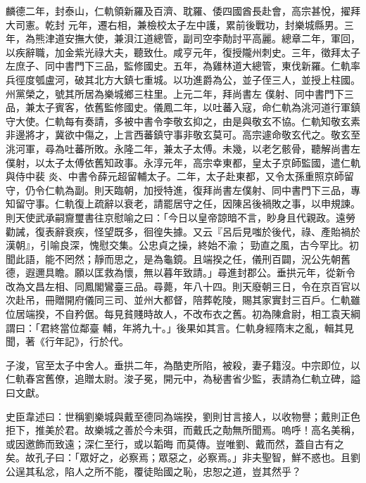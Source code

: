 \begin{pinyinscope}
 麟德二年，封泰山，仁軌領新羅及百濟、耽羅、倭四國酋長赴會，高宗甚悅，擢拜大司憲。乾封
 元年，遷右相，兼檢校太子左中護，累前後戰功，封樂城縣男。三年，為熊津道安撫大使，兼浿江道總管，副司空李勣討平高麗。總章二年，軍回，以疾辭職，加金紫光祿大夫，聽致仕。咸亨元年，復授隴州刺史。三年，徵拜太子左庶子、同中書門下三品，監修國史。五年，為雞林道大總管，東伐新羅。仁軌率兵徑度瓠盧河，破其北方大鎮七重城。以功進爵為公，並子侄三人，並授上柱國。州黨榮之，號其所居為樂城鄉三柱里。上元二年，拜尚書左
 僕射、同中書門下三品，兼太子賓客，依舊監修國史。儀鳳二年，以吐蕃入寇，命仁軌為洮河道行軍鎮守大使。仁軌每有奏請，多被中書令李敬玄抑之，由是與敬玄不協。仁軌知敬玄素非邊將才，冀欲中傷之，上言西蕃鎮守事非敬玄莫可。高宗遽命敬玄代之。敬玄至洮河軍，尋為吐蕃所敗。永隆二年，兼太子太傅。未幾，以老乞骸骨，聽解尚書左僕射，以太子太傅依舊知政事。永淳元年，高宗幸東都，皇太子京師監國，遣仁軌與侍中裴
 炎、中書令薛元超留輔太子。二年，太子赴東都，又令太孫重照京師留守，仍令仁軌為副。則天臨朝，加授特進，復拜尚書左僕射、同中書門下三品，專知留守事。仁軌復上疏辭以衰老，請罷居守之任，因陳呂後禍敗之事，以申規諫。則天使武承嗣齎璽書往京慰喻之曰：「今日以皇帝諒暗不言，眇身且代親政。遠勞勸誡，復表辭衰疾，怪望既多，徊徨失據。又云『呂后見嗤於後代，祿、產貽禍於漢朝』，引喻良深，愧慰交集。公忠貞之操，終始不渝；
 勁直之風，古今罕比。初聞此語，能不罔然；靜而思之，是為龜鏡。且端揆之任，儀刑百闢，況公先朝舊德，遐邇具瞻。願以匡救為懷，無以暮年致請。」尋進封郡公。垂拱元年，從新令改為文昌左相、同鳳閣鸞臺三品。尋薨，年八十四。則天廢朝三日，令在京百官以次赴吊，冊贈開府儀同三司、並州大都督，陪葬乾陵，賜其家實封三百戶。仁軌雖位居端揆，不自矜倨。每見貧賤時故人，不改布衣之舊。初為陳倉尉，相工袁天綱謂曰：「君終當位鄰臺
 輔，年將九十。」後果如其言。仁軌身經隋末之亂，輯其見聞，著《行年記》，行於代。



 子浚，官至太子中舍人。垂拱二年，為酷吏所陷，被殺，妻子籍沒。中宗即位，以仁軌春宮舊僚，追贈太尉。浚子冕，開元中，為秘書省少監，表請為仁軌立碑，謚曰文獻。



 史臣韋述曰：世稱劉樂城與戴至德同為端揆，劉則甘言接人，以收物譽；戴則正色拒下，推美於君。故樂城之善於今未弭，而戴氏之勣無所聞焉。嗚呼！高名美稱，或因邀飾而致遠；深仁至行，或以韜晦
 而莫傳。豈唯劉、戴而然，蓋自古有之矣。故孔子曰：「眾好之，必察焉；眾惡之，必察焉。」非夫聖智，鮮不惑也。且劉公逞其私忿，陷人之所不能，覆徒貽國之恥，忠恕之道，豈其然乎？




\end{pinyinscope}
